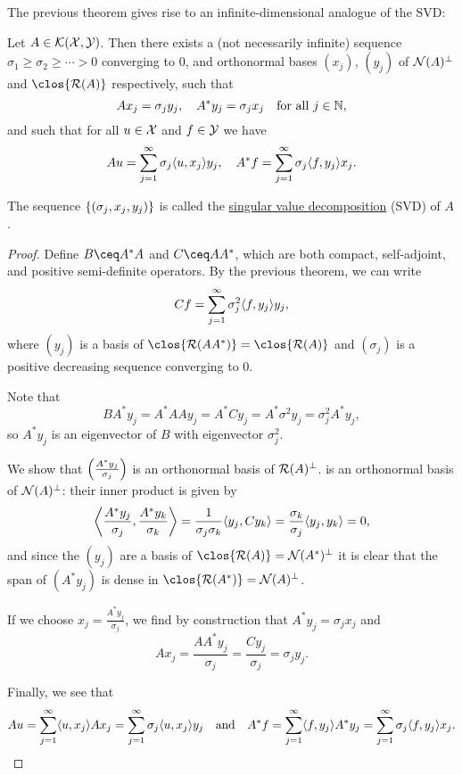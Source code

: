The previous theorem gives rise to an infinite-dimensional analogue of the SVD:
\begin{theorem}
    Let $A \in \KK(\XX, \YY)$. Then there exists a (not necessarily infinite) sequence $\sigma_1 \geq \sigma_2 \geq \dotsb > 0$ converging to 0, and orthonormal bases $(x_j)$, $(y_j)$ of $\Nul(A)\P$ and $\clos{\Ran(A)}$ respectively, such that
    \[
    Ax_j = \sigma_j y_j, \quad A^* y_j = \sigma_j x_j \quad\text{for all $j \in \NN$}, 
    \]
    and such that for all $u \in \XX$ and $f \in \YY$ we have
    \[
    Au = \sum_{j=1}^\infty \sigma_j \ang{u, x_j} y_j, \quad A^* f = \sum_{j=1}^\infty \sigma_j \ang{f, y_j} x_j.
    \]
    
    The sequence $\qty{(\sigma_j, x_j, y_j)}$ is called the \uline{singular value decomposition} (SVD) of $A$.
\end{theorem}

\begin{proof}
    Define $B \ceq A^*A$ and $C \ceq AA^*$, which are both compact, self-adjoint, and positive semi-definite operators. By the previous theorem, we can write
    \[
     Cf = \sum_{j=1}^\infty \sigma_j^2 \ang{f, y_j} y_j,
    \]
    where $(y_j)$ is a basis of $\clos{\Ran(AA^*)} = \clos{\Ran(A)}$ and $(\sigma_j)$ is a positive decreasing sequence converging to 0.  
    
    Note that
    \[
    B A^* y_j = A^* A A y_j = A^* C y_j = A^* \sigma^2 y_j = \sigma_j^2 A^* y_j,
    \]
    so $A^* y_j$ is an eigenvector of $B$ with eigenvector $\sigma_j^2$. 
    
    We show that $\qty(\frac{A^* y_j}{\sigma_j})$ is an orthonormal basis of $\Ran(A)\P$. is an orthonormal basis of $\Nul(A)\P$: their inner product is given by 
    \[
    \ang*{\frac{A^* y_j}{\sigma_j}, \frac{A^* y_k}{\sigma_k}} = \frac{1}{\sigma_j\sigma_k} \ang{y_j, C y_k} = \frac{\sigma_k}{\sigma_j} \ang{y_j, y_k} = 0, 
    \]
    and since the $(y_j)$ are a basis of $\clos{\Ran(A)} = \Nul(A^*)\P$ it is clear that the span of $(A^* y_j)$ is dense in $\clos{\Ran(A^*)} = \Nul(A)\P$. 
    
    If we choose $x_j = \frac{A^* y_j}{\sigma_j}$, we find by construction that $A^* y_j = \sigma_j x_j$ and 
    \[
    A x_j = \frac{AA^* y_j}{\sigma_j} = \frac{C y_j}{\sigma_j} = \sigma_j y_j.
    \]
    
    Finally, we see that
    \[
    A u = \sum_{j=1}^\infty  \ang{u, x_j} Ax_j = \sum_{j=1}^\infty \sigma_j \ang{u, x_j} y_j \quad\text{and}\quad A^* f = \sum_{j=1}^\infty \ang{f, y_j} A^* y_j = \sum_{j=1}^\infty \sigma_j \ang{f, y_j} x_j. 
    \]
\end{proof}

